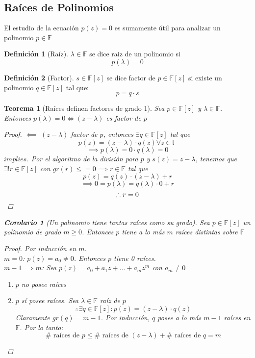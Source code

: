 \documentclass[11pt]{book}
\newtheorem{thm}{Teorema}[section]
\newtheorem*{cor}{Corolario}
\theoremstyle{definition}
\newtheorem{defn}{Definición}[section]
\begin{document}
\subsection{Raíces de Polinomios}
El estudio de la ecuación $p(z)=0$ es sumamente útil para analizar un polinomio $p\in\mathbb{F}$
\begin{defn}[Raíz]
	$\lambda\in\mathbb{F}$ se dice raiz de un polinomio si
	\[p(\lambda)=0\]
\end{defn}
\begin{defn}[Factor]
	$s\in\mathbb{F}[z]$ se dice factor de $p\in\mathbb{F}[z]$ si existe un polinomio $q\in\mathbb{F}[z]$ tal que:
	\[p=q\cdot s\]
\end{defn}
\begin{thm}[Raíces definen factores de grado 1]
	Sea $p\in\mathbb{F}[z]$ y $\lambda\in\mathbb{F}$. Entonces $p(\lambda)=0\iff(z-\lambda)$ es factor de $p$
	\begin{proof}
		$\impliedby$ $(z-\lambda)$ factor de $p$, entonces $\exists q\in\mathbb{F}[z]$ tal que
		\[p(z)=(z-\lambda)\cdot q(z)\forall z\in\mathbb{F}\]
		\[\implies p(\lambda)=0\cdot q(\lambda)=0\]
		$implies$. Por el algoritmo de la división para $p$ y $s(z)=z-\lambda$, tenemos que $\exists !r\in\mathbb{F}[z]$ con $gr(r)\leq=0\implies r\in\mathbb{F}$ tal que
		\[p(z)=q(z)\cdot (z-\lambda)+r\]
		\[\implies 0=p(\lambda)=q(\lambda)\cdot 0+r\]
		\[\therefore r=0\qedhere\]
	\end{proof}
	\begin{cor}[Un polinomio tiene tantas raíces como su grado]
		Sea $p\in\mathbb{F}[z]$ un polinomio de grado $m\geq 0$. Entonces $p$ tiene a lo más $m$ raíces distintas sobre $\mathbb{F}$
		\begin{proof}
			Por inducción en $m$.\\
			$m=0$: $p(z)=a_0\neq 0$. Entonces $p$ tiene 0 raíces.\\
			$m-1\implies m$: Sea $p(z)=a_0+a_1z+...+a_mz^m$ con $a_m\neq 0$
			\begin{enumerate}[label= \underline{Caso \arabic*}:]
				\item $p$ no posee raíces

				\item $p$ sí posee raíces. Sea $\lambda\in\mathbb{F}$ raíz de $p$
				      \[\therefore \exists q\in\mathbb{F}[z]: p(z)=(z-\lambda)\cdot q(z)\]
				      Claramente $gr(q)=m-1$. Por inducción, $q$ posee a lo más $m-1$ raíces en $\mathbb{F}$. Por lo tanto:
				      \[\#\textrm{ raíces de }p\leq \#\textrm{ raíces de }(z-\lambda)+\#\textrm{ raíces de }q=m\]
			\end{enumerate}
		\end{proof}
	\end{cor}
\end{thm}
\end{document}
